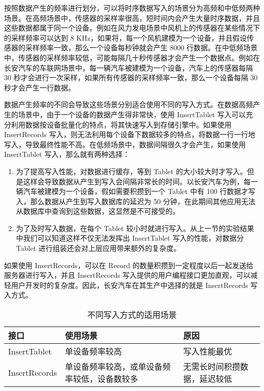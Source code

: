 按照数据产生的频率进行划分，可以将时序数据写入的场景分为高频和中低频两种场景。在高频场景中，传感器的采样率很高，短时间内会产生大量时序数据，并且这些数据都属于同一个设备。例如在风力发电场景中风机上的传感器在某些情况下的采样频率可以达到 8 KHz\cite{李天安2020apache}，如果将，每一个风机建模为一个设备，并且假设传感器的采样频率一致，那么一个设备每秒钟就会产生 8000 行数据。在中低频场景中，传感器的采样频率较低，可能每隔几十秒传感器才会产生一个数据点。例如在长安汽车的车联网场景中，每一辆汽车被建模为一个设备，汽车上的传感器每隔 30 秒才会进行一次采样，如果所有传感器的采样频率一致，那么一个设备每隔 30 秒才会产生一行数据。

数据产生频率的不同会导致这些场景分别适合使用不同的写入方式。在数据高频产生的场景中，由于一个设备的数据产生得非常快，使用 InsertTablet 写入可以充分利用数据按设备批量化的特点，将其快速写入到存储引擎中。如果使用 InsertRecords 写入，则无法利用每个设备下数据较多的特点，将数据一行一行地写入，导致最终性能不高。在低频场景中，数据间隔很久才会产生，如果使用 InsertTablet 写入，那么就有两种选择：
\begin{enumerate}
  \item 为了提高写入性能，对数据进行缓存，等到 Tablet 的大小较大时才写入。但是这样会导致数据从产生到写入会间隔非常长的时间。以长安汽车为例，每一辆汽车被建模为一个设备，假如需要积攒到一个 Tablet 中有 100 行数据才写入，那么数据从产生到写入数据库的延迟为 50 分钟，在此期间其他应用无法从数据库中查询到这些数据，这显然是不可接受的。
  \item 为了及时写入数据，在每个 Tablet 较小时就进行写入。从上一节的实验结果中我们可以知道这样不仅无法发挥出 InsertTablet 写入的性能，对数据分 Tablet 进行组装还会对上层应用带来额外的复杂度。
\end{enumerate}
如果使用 InsertRecords，可以在 Record 的数量积攒到一定程度以后一起发送给服务器进行写入，并且 InsertRecords 写入提供的用户编程接口更加直观，可以减轻用户开发时的复杂度。因此，长安汽车在其生产中选择的就是 InsertRecords 写入方式。

\begin{table}
  \centering
  \caption{不同写入方式的适用场景}
  \begin{tabular}{lp{5cm}l}
    \toprule
    接口 & 使用场景 & 原因 \\
    \midrule
    InsertTablet & 单设备频率较高 & 写入性能最优\\
     InsertRecords &  单设备频率较高，或单设备频率较低，设备数较多 & 无需长时间积攒数据，延迟较低 \\
    \bottomrule
  \end{tabular}
  \label{tabular:insert-interfaces-scene}
\end{table}

